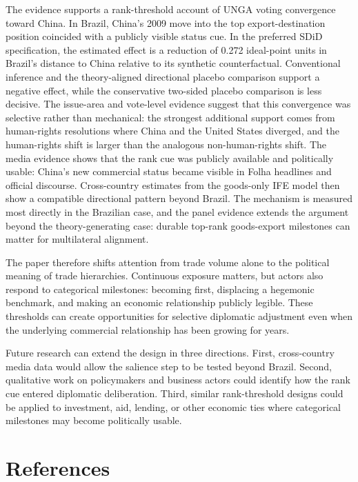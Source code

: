 \documentclass[
  12pt,
]{article}
\begin{document}
The evidence supports a rank-threshold account of UNGA voting convergence toward China. In Brazil, China's 2009 move into the top export-destination position coincided with a publicly visible status cue. In the preferred SDiD specification, the estimated effect is a reduction of 0.272 ideal-point units in Brazil's distance to China relative to its synthetic counterfactual. Conventional inference and the theory-aligned directional placebo comparison support a negative effect, while the conservative two-sided placebo comparison is less decisive. The issue-area and vote-level evidence suggest that this convergence was selective rather than mechanical: the strongest additional support comes from human-rights resolutions where China and the United States diverged, and the human-rights shift is larger than the analogous non-human-rights shift. The media evidence shows that the rank cue was publicly available and politically usable: China's new commercial status became visible in Folha headlines and official discourse. Cross-country estimates from the goods-only IFE model then show a compatible directional pattern beyond Brazil. The mechanism is measured most directly in the Brazilian case, and the panel evidence extends the argument beyond the theory-generating case: durable top-rank goods-export milestones can matter for multilateral alignment.

The paper therefore shifts attention from trade volume alone to the political meaning of trade hierarchies. Continuous exposure matters, but actors also respond to categorical milestones: becoming first, displacing a hegemonic benchmark, and making an economic relationship publicly legible. These thresholds can create opportunities for selective diplomatic adjustment even when the underlying commercial relationship has been growing for years.

Future research can extend the design in three directions. First, cross-country media data would allow the salience step to be tested beyond Brazil. Second, qualitative work on policymakers and business actors could identify how the rank cue entered diplomatic deliberation. Third, similar rank-threshold designs could be applied to investment, aid, lending, or other economic ties where categorical milestones may become politically usable.

\clearpage

\section*{References}\label{references}
\end{document}
